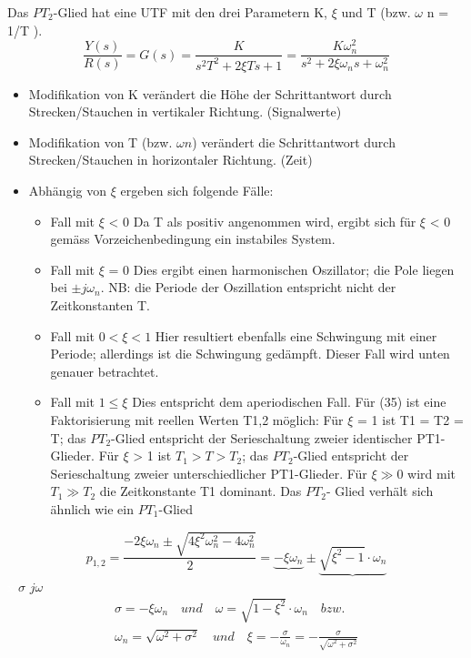 Das $PT_2$-Glied hat eine UTF mit den drei Parametern K, $\xi$ und T (bzw. $\omega$ n = 1/T ).
\begin{equation}
\boxed{\frac{Y(s)}{R(s)}=G(s)=\frac{K}{s^2T^2+2\xi Ts+1}=\frac{K\omega^{2}_{n}}{s^2 + 2\xi \omega_{n}s+\omega^{2}_{n}}}
\end{equation}
\begin{itemize}
\item Modifikation
von K verändert die Höhe der Schrittantwort durch Strecken/Stauchen in
vertikaler Richtung. (Signalwerte)
\item Modifikation von T (bzw. $\omega n$) verändert
die Schrittantwort durch Strecken/Stauchen in horizontaler Richtung. (Zeit)
\item Abhängig von $\xi$ ergeben sich folgende Fälle:
\begin{itemize}
\item Fall mit $\xi$ < 0
Da T als positiv angenommen wird, ergibt sich für $\xi$ < 0 gemäss Vorzeichenbedingung
ein instabiles System.
\item Fall mit $\xi$ = 0
Dies ergibt einen harmonischen Oszillator; die Pole liegen bei $\pm j\omega_{n}$.
NB: die Periode der Oszillation entspricht nicht der Zeitkonstanten T.
\item Fall mit $ 0 < \xi < 1$
Hier resultiert ebenfalls eine Schwingung mit einer Periode; allerdings ist
die Schwingung gedämpft. Dieser Fall wird unten genauer betrachtet.
\item Fall mit $1 \leq \xi$
Dies entspricht dem aperiodischen Fall. Für (35) ist eine Faktorisierung
mit reellen Werten T1,2 möglich:
Für $\xi$ = 1 ist T1 = T2 = T; das $PT_2$-Glied entspricht der Serieschaltung
zweier identischer PT1-Glieder.
Für $\xi$ > 1 ist $T_1 > T > T_2$; das $PT_2$-Glied entspricht der Serieschaltung
zweier unterschiedlicher PT1-Glieder.
Für $\xi \gg 0$ wird mit $T_1 \gg T_2$ die Zeitkonstante T1 dominant. Das $PT_2$-
Glied verhält sich ähnlich wie ein $PT_1$-Glied
\end{itemize}
\end{itemize}

\[p_{1,2}=\frac{-2\xi\omega_n \pm \sqrt{4\xi^2 \omega^2_n - 4\omega^2_n}}{2}=\underbrace{-\xi\omega_n} \pm \underbrace{\sqrt{\xi^2-1}\cdot \omega_n}\]
\textcolor{white}{x} \hspace{10.5cm} $\sigma$ 
\hspace{1.5cm} $j\omega$
\begin{eqnarray}
\sigma=-\xi\omega_n \quad und \quad \omega=\sqrt{1-\xi^2}\cdot \omega_n  \quad bzw. \\ \omega_n=\sqrt{\omega^2 + \sigma^2}  \quad und  \quad \xi = -\frac{\sigma}{\omega_n}=-\frac{\sigma}{\sqrt{\omega^2 + \sigma^2}}\label{xiOmega}
\end{eqnarray}

